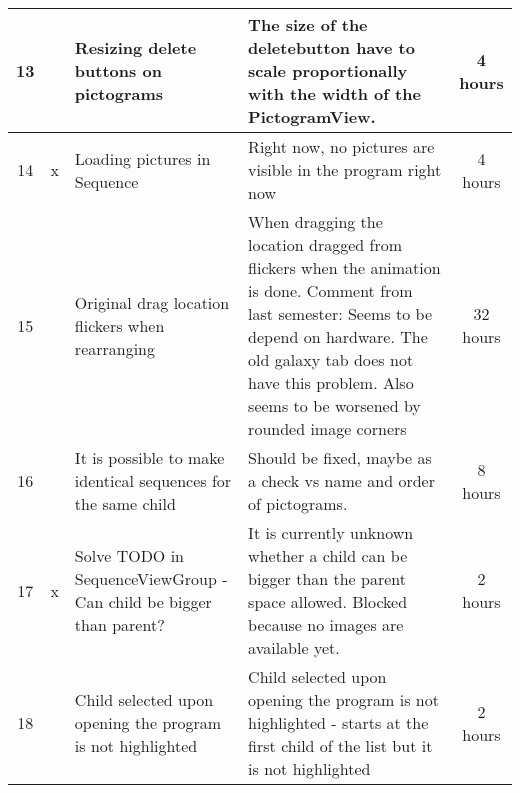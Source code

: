\begin{longtable} { | c | c | p{5cm} | p{5cm} | c | }
	13	& 		&	Resizing delete buttons on pictograms	&	The size of the deletebutton have to scale proportionally with the width of the PictogramView.	&	4 hours	\\\hline
	14	& 	x	&	Loading pictures in Sequence	&	Right now, no pictures are visible in the program right now	&	4 hours	\\\hline
	15	& 		&	Original drag location flickers when rearranging	&	When dragging the location dragged from flickers when the animation is done. Comment from last semester: Seems to be depend on hardware. The old galaxy tab does not have this problem. Also seems to be worsened by rounded image corners	&	32 hours 	\\\hline
	16	& 		&	It is possible to make identical sequences for the same child	&	Should be fixed, maybe as a check vs name and order of pictograms.	&	8 hours	\\\hline
	17	& 	x	&	Solve TODO in SequenceViewGroup - Can child be bigger than parent?	&	It is currently unknown whether a child can be bigger than the parent space allowed. Blocked because no images are available yet.	&	2 hours	\\\hline
	18	& 		&	Child selected upon opening the program is not highlighted	&	Child selected upon opening the program is not highlighted - starts at the first child of the list but it is not highlighted	&	2 hours	\\\hline

\end{longtable}

